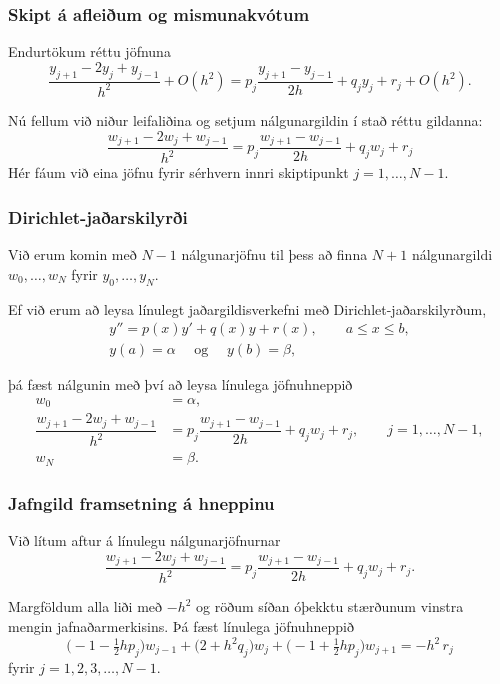\documentclass[icelandic,a4paper,12pt]{article}
\begin{document}
\subsubsection{Skipt á afleiðum og mismunakvótum} 
Endurtökum réttu jöfnuna
$$
\dfrac{y_{j+1}-2y_j+y_{j-1}}{h^2} +O(h^2)
=p_j\dfrac{y_{j+1}-y_{j-1}}{2h}+q_jy_j+r_j+ O(h^2).
$$

\pause
Nú fellum við niður leifaliðina og 
setjum nálgunargildin í stað réttu gildanna:
$$
\dfrac{w_{j+1}-2w_j+w_{j-1}}{h^2}
=p_j\dfrac{w_{j+1}-w_{j-1}}{2h}+q_jw_j+r_j
$$
Hér fáum við eina jöfnu fyrir sérhvern innri skiptipunkt
$j=1,\dots,N-1$.



\subsubsection{Dirichlet-jaðarskilyrði} 
Við erum komin með $N-1$ 
nálgunarjöfnu til þess að finna $N+1$
nálgunargildi $w_0,\dots,w_N$ fyrir $y_0,\dots,y_N$. 

\smallskip
Ef við erum að leysa línulegt jaðargildisverkefni með 
Dirichlet-jaðarskilyrðum,
  \begin{gather*}
    y''=p(x)y'+q(x)y+r(x), \qquad a\leq x\leq b,\\
y(a)=\alpha \quad \text{ og } \quad y(b)=\beta,
  \end{gather*}

\pause
þá fæst nálgunin með því að leysa línulega jöfnuhneppið
\begin{align*}
w_0&=\alpha,\\
\dfrac{w_{j+1}-2w_j+w_{j-1}}{h^2}
&=p_j\dfrac{w_{j+1}-w_{j-1}}{2h}+q_jw_j+r_j, \qquad j=1,\dots,N-1,\\
w_N&=\beta.  
\end{align*}



\subsubsection{Jafngild framsetning á hneppinu} 
Við lítum aftur á línulegu nálgunarjöfnurnar
$$
\dfrac{w_{j+1}-2w_j+w_{j-1}}{h^2}
=p_j\dfrac{w_{j+1}-w_{j-1}}{2h}+q_jw_j+r_j.
$$

\pause
Margföldum alla liði með $-h^2$ og röðum síðan óþekktu stærðunum
vinstra mengin jafnaðarmerkisins. Þá fæst línulega jöfnuhneppið
$$
\big(-1-\tfrac 12 h p_j\big)w_{j-1}
+\big(2+h^2q_j\big) w_j
+\big(-1+\tfrac 12 h p_j\big)w_{j+1}
=-h^2\, r_j
$$
fyrir $j=1,2,3,\dots,N-1$.
\end{document}
